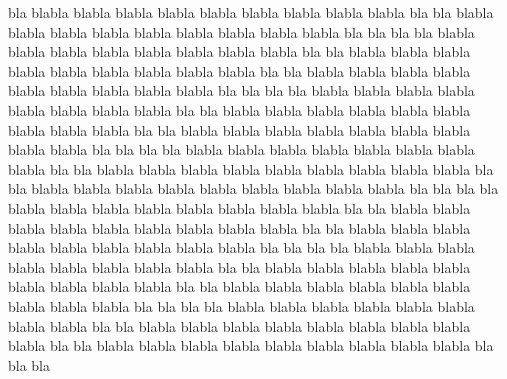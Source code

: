 \documentclass[12pt,a4paper,english]{book}
\begin{document}
bla blabla blabla blabla blabla blabla blabla blabla blabla blabla bla
bla blabla blabla blabla blabla blabla blabla blabla blabla blabla bla
bla bla
bla blabla blabla blabla blabla blabla blabla blabla blabla bla
bla blabla blabla blabla blabla blabla blabla blabla blabla blabla bla
bla blabla blabla blabla blabla blabla blabla blabla blabla blabla bla
bla bla
bla blabla blabla blabla blabla blabla blabla blabla blabla bla
bla blabla blabla blabla blabla blabla blabla blabla blabla blabla bla
bla blabla blabla blabla blabla blabla blabla blabla blabla blabla bla
bla bla
bla blabla blabla blabla blabla blabla blabla blabla blabla bla
bla blabla blabla blabla blabla blabla blabla blabla blabla blabla bla
bla blabla blabla blabla blabla blabla blabla blabla blabla blabla bla
bla bla
bla blabla blabla blabla blabla blabla blabla blabla blabla bla
bla blabla blabla blabla blabla blabla blabla blabla blabla blabla bla
bla blabla blabla blabla blabla blabla blabla blabla blabla blabla bla
bla bla
bla blabla blabla blabla blabla blabla blabla blabla blabla bla
bla blabla blabla blabla blabla blabla blabla blabla blabla blabla bla
bla blabla blabla blabla blabla blabla blabla blabla blabla blabla bla
bla bla
bla blabla blabla blabla blabla blabla blabla blabla blabla bla
bla blabla blabla blabla blabla blabla blabla blabla blabla blabla bla
bla blabla blabla blabla blabla blabla blabla blabla blabla blabla bla
bla bla
\end{document}
